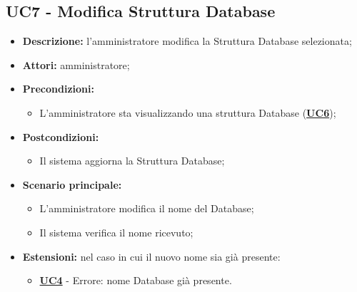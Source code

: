 \subsection{UC7 - Modifica Struttura Database}
\label{sec:UC7}
\begin{itemize}
	\item \textbf{Descrizione:} l’amministratore modifica la Struttura Database selezionata;
	\item \textbf{Attori:} amministratore;
	\item \textbf{Precondizioni:} 
	\begin{itemize}
		\item L’amministratore sta visualizzando una struttura Database (\hyperref[sec:UC6]{\textbf{UC6}});
	\end{itemize}
	\item \textbf{Postcondizioni:} 
	\begin{itemize}
		\item Il sistema aggiorna la Struttura Database;
	\end{itemize}
	\item \textbf{Scenario principale:} 
	\begin{itemize}
		\item L’amministratore modifica il nome del Database;
		\item Il sistema verifica il nome ricevuto;
	\end{itemize}
	\item \textbf{Estensioni:} nel caso in cui il nuovo nome sia già presente:
	\begin{itemize}
		\item \hyperref[sec:UC4]{\textbf{UC4}} - Errore: nome Database già presente.
	\end{itemize}
\end{itemize}

